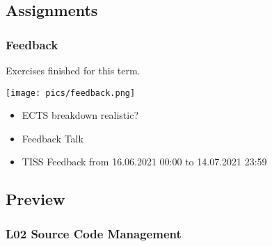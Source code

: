 \subsection{Assignments}

\begin{frame}
	\frametitle{Feedback}
	Exercises finished for this term.

	\hfill \texttt{[image: pics/feedback.png]}
	\vspace{-1cm}
	\begin{itemize}
		\item ECTS breakdown realistic?
		\item Feedback Talk
		\item TISS Feedback from 16.06.2021 00:00 to 14.07.2021 23:59
	\end{itemize}
\end{frame}

\subsection{Preview}

\begin{frame}
	\frametitle{L02 Source Code Management}
\end{frame}



\nocite{raab2017introducing}

\appendix

\begin{frame}[allowframebreaks]
	
	
\end{frame}




